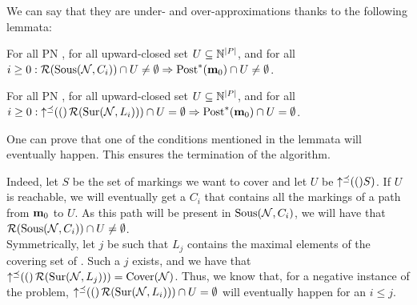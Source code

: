 We can say that they are under- and over-approximations thanks to the following lemmata:
\begin{lemm}
  For all \ac{PN} \NPTm, for all upward-closed set $U \subseteq \mathbb{N}^{\left|P\right|}$, and for all $i \geq 0: \operatorname{\mathcal{R}}(\operatorname{Sous}(\mathcal{N},C_i)) \cap U \neq \emptyset \Rightarrow \operatorname{Post}^*(\mathbf{m}_0) \cap U \neq \emptyset$.
\end{lemm}
\begin{lemm}
  For all \ac{PN} \NPTm, for all upward-closed set $U \subseteq \mathbb{N}^{\left|P\right|}$, and for all $i \geq 0: \operatorname{\uparrow^\preceq}(()\operatorname{\mathcal{R}}(\operatorname{Sur}(\mathcal{N},L_i))) \cap U = \emptyset \Rightarrow \operatorname{Post}^*(\mathbf{m}_0) \cap U = \emptyset$.
\end{lemm}

One can prove that one of the conditions mentioned in the lemmata will eventually happen.
This ensures the termination of the algorithm.

Indeed, let $S$ be the set of markings we want to cover and let $U$ be $\operatorname{\uparrow^\preceq}(()S)$.
If $U$ is reachable, we will eventually get a $C_i$ that contains all the markings of a path from $\mathbf{m}_0$ to $U$.
As this path will be present in $\operatorname{Sous}(\mathcal{N}, C_i)$, we will have that $\operatorname{\mathcal{R}}(\operatorname{Sous}(\mathcal{N},C_i)) \cap U \neq \emptyset$.\\
Symmetrically, let $j$ be such that $L_j$ contains the maximal elements of the covering set of \namePN.
Such a $j$ exists, and we have that $\operatorname{\uparrow^\preceq}(()\operatorname{\mathcal{R}}(\operatorname{Sur}(\mathcal{N},L_j))) = \operatorname{Cover}(\mathcal{N})$.
Thus, we know that, for a negative instance of the problem, $\operatorname{\uparrow^\preceq}(()\operatorname{\mathcal{R}}(\operatorname{Sur}(\mathcal{N},L_i))) \cap U = \emptyset$ will eventually happen for an $i \leq j$.


